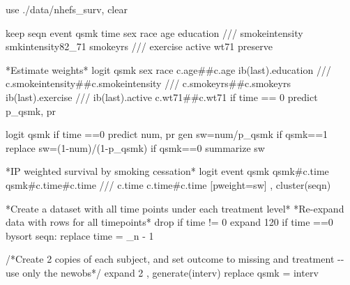 \documentclass[
  10pt,
  a4paper,
]{book}
\newenvironment{Shaded}{\begin{snugshade}}{\end{snugshade}}
\newcommand{\BaseNTok}[1]{\textcolor[rgb]{0.68,0.00,0.00}{#1}}
\newcommand{\CommentTok}[1]{\textcolor[rgb]{0.37,0.37,0.37}{#1}}
\newcommand{\DataTypeTok}[1]{\textcolor[rgb]{0.68,0.00,0.00}{#1}}
\newcommand{\DecValTok}[1]{\textcolor[rgb]{0.68,0.00,0.00}{#1}}
\newcommand{\FunctionTok}[1]{\textcolor[rgb]{0.28,0.35,0.67}{#1}}
\newcommand{\KeywordTok}[1]{\textcolor[rgb]{0.00,0.46,0.62}{#1}}
\newcommand{\NormalTok}[1]{\textcolor[rgb]{0.00,0.46,0.62}{#1}}
\newcommand{\OtherTok}[1]{\textcolor[rgb]{0.00,0.46,0.62}{#1}}
\begin{document}
\begin{Shaded}
\begin{Highlighting}[]
\KeywordTok{use}\NormalTok{ ./}\KeywordTok{data}\NormalTok{/nhefs\_surv, }\KeywordTok{clear}

\KeywordTok{keep}\NormalTok{ seqn event qsmk time sex race age education }\CommentTok{///}
\NormalTok{  smokeintensity smkintensity82\_71 smokeyrs }\CommentTok{///}
\NormalTok{  exercise active wt71}
\KeywordTok{preserve} 

\NormalTok{*Estimate weights*}
\KeywordTok{logit}\NormalTok{ qsmk sex race c.age\#\#c.age ib(}\FunctionTok{last}\NormalTok{).education }\CommentTok{///}
\NormalTok{  c.smokeintensity\#\#c.smokeintensity }\CommentTok{///}
\NormalTok{  c.smokeyrs\#\#c.smokeyrs ib(}\FunctionTok{last}\NormalTok{).exercise }\CommentTok{///}
\NormalTok{  ib(}\FunctionTok{last}\NormalTok{).active c.wt71\#\#c.wt71 }\KeywordTok{if}\NormalTok{ time == 0}
\KeywordTok{predict}\NormalTok{ p\_qsmk, pr}

\KeywordTok{logit}\NormalTok{ qsmk }\KeywordTok{if}\NormalTok{ time ==0 }
\KeywordTok{predict}\NormalTok{ num, pr}
\KeywordTok{gen} \KeywordTok{sw}\NormalTok{=num/p\_qsmk }\KeywordTok{if}\NormalTok{ qsmk==1}
\KeywordTok{replace} \KeywordTok{sw}\NormalTok{=(1{-}num)/(1{-}p\_qsmk) }\KeywordTok{if}\NormalTok{ qsmk==0}
\KeywordTok{summarize} \KeywordTok{sw}

\NormalTok{*IP weighted survival }\KeywordTok{by}\NormalTok{ smoking cessation*}
\KeywordTok{logit}\NormalTok{ event qsmk qsmk\#c.time qsmk\#c.time\#c.time }\CommentTok{///}
\NormalTok{  c.time c.time\#c.time [}\KeywordTok{pweight}\NormalTok{=}\KeywordTok{sw}\NormalTok{] , }\KeywordTok{cluster}\NormalTok{(seqn) }

\NormalTok{*Create a dataset with }\OtherTok{all}\NormalTok{ time points under each treatment }\DecValTok{level}\NormalTok{*}
\NormalTok{*Re{-}expand }\KeywordTok{data}\NormalTok{ with }\BaseNTok{rows} \KeywordTok{for} \OtherTok{all}\NormalTok{ timepoints*}
\KeywordTok{drop} \KeywordTok{if}\NormalTok{ time != 0}
\NormalTok{expand 120 }\KeywordTok{if}\NormalTok{ time ==0 }
\KeywordTok{bysort}\NormalTok{ seqn: }\KeywordTok{replace}\NormalTok{ time = }\DataTypeTok{\_n}\NormalTok{ {-} 1       }
        
\CommentTok{/*Create 2 copies of each subject, and set outcome }
\CommentTok{to missing and treatment {-}{-} use only the newobs*/}
\NormalTok{expand 2 , }\KeywordTok{generate}\NormalTok{(interv) }
\KeywordTok{replace}\NormalTok{ qsmk = interv   }


\end{Highlighting}
\end{Shaded}
\end{document}

